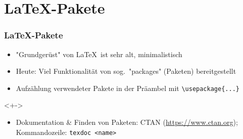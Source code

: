 \section{\LaTeX-Pakete}

\begin{frame}[<+->][fragile]
	\frametitle{\LaTeX-Pakete}
	
	\lstset{frame=L, numbers=left, xleftmargin=0.5cm}
	\begin{itemize}
		\item "Grundgerüst" von \LaTeX\ ist sehr alt, minimalistisch
		\item Heute: Viel Funktionalität von sog.\ "packages" (Paketen) bereitgestellt
		\item Aufzählung verwendeter Pakete in der Präambel mit \lstinline!\usepackage{...}!		
	\end{itemize}
	
	
	\begin{visibleenv}<+->
	\hspace{0.5cm}
	\end{visibleenv}
	
	\begin{itemize}
		\item Dokumentation \& Finden von Paketen: CTAN (\url{https://www.ctan.org}); Kommandozeile: \texttt{texdoc <name>}
	\end{itemize}
\end{frame}

